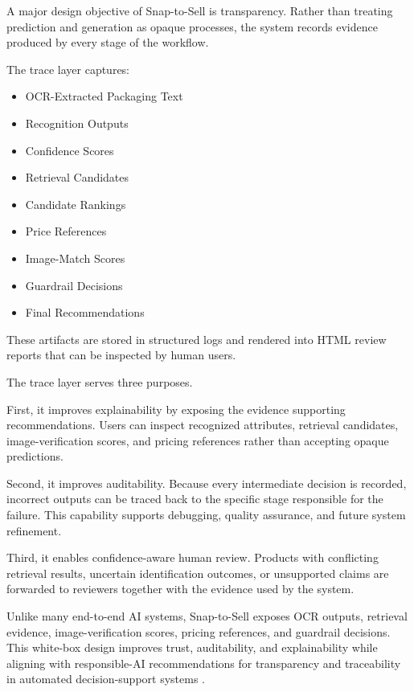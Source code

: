 \documentclass[conference]{IEEEtran}
\begin{document}
A major design objective of Snap-to-Sell is transparency.
Rather than treating prediction and generation as opaque processes,
the system records evidence produced by every stage of the workflow.

The trace layer captures:

\begin{itemize}
\item OCR-Extracted Packaging Text
\item Recognition Outputs
\item Confidence Scores
\item Retrieval Candidates
\item Candidate Rankings
\item Price References
\item Image-Match Scores
\item Guardrail Decisions
\item Final Recommendations
\end{itemize}

These artifacts are stored in structured logs and rendered into
HTML review reports that can be inspected by human users.

The trace layer serves three purposes.

First, it improves explainability by exposing the evidence supporting
recommendations. Users can inspect recognized attributes, retrieval
candidates, image-verification scores, and pricing references rather
than accepting opaque predictions.

Second, it improves auditability. Because every intermediate decision
is recorded, incorrect outputs can be traced back to the specific
stage responsible for the failure. This capability supports debugging,
quality assurance, and future system refinement.

Third, it enables confidence-aware human review. Products with
conflicting retrieval results, uncertain identification outcomes,
or unsupported claims are forwarded to reviewers together with the
evidence used by the system.

Unlike many end-to-end AI systems, Snap-to-Sell exposes OCR outputs,
retrieval evidence, image-verification scores, pricing references,
and guardrail decisions. This white-box design improves trust,
auditability, and explainability while aligning with responsible-AI
recommendations for transparency and traceability in automated
decision-support systems \cite{li2024modict}.


%
%
%
\end{document}
